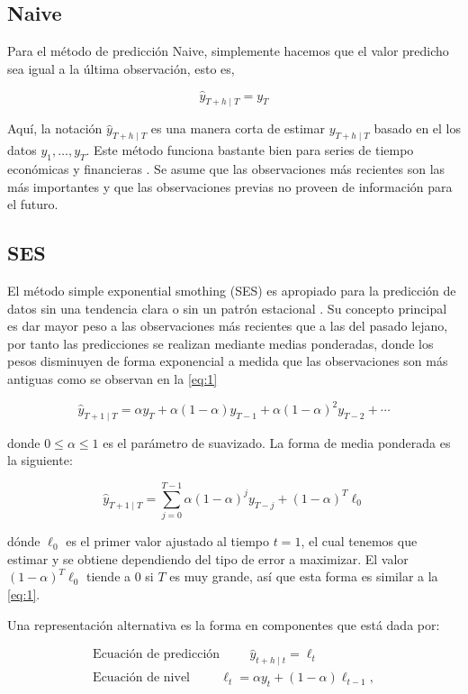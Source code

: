 \subsection{Naive}

Para el método de predicción Naive, simplemente hacemos que el valor predicho sea igual a la última observación, esto es,

\[ \hat{y}_{T+h \mid T}=y_{T} \]

Aquí, la notación $\hat{y}_{T+h \mid T}$ es una manera corta de estimar $y_{T+h \mid T}$ basado en el los datos $y_{1}, \ldots, y_{T}$. Este método funciona bastante bien para series de tiempo económicas y financieras \cite{hyndmanForecastingPrinciplesPractice}.
Se asume que las observaciones más recientes son las más importantes y que las observaciones previas no proveen de información para el futuro.

\subsection{SES}
El método simple exponential smothing (SES) es apropiado para la predicción de datos sin una tendencia clara o sin un patrón estacional \cite{hyndmanForecastingPrinciplesPractice}. Su concepto principal es dar mayor peso a las observaciones más recientes que a las del pasado lejano, por tanto las predicciones se realizan mediante medias ponderadas, donde los pesos disminuyen de forma exponencial a medida que las observaciones son más antiguas como se observan en la \autoref{eq:1}

\begin{equation}
	\hat{y}_{T+1 \mid T}=\alpha y_{T}+\alpha(1-\alpha) y_{T-1}+\alpha(1-\alpha)^{2} y_{T-2}+\cdots
	\label{eq:1}
\end{equation}

donde $0 \leq \alpha \leq 1$ es el parámetro de suavizado. La forma de media ponderada es la siguiente:

\[\hat{y}_{T+1 \mid T}=\sum_{j=0}^{T-1} \alpha(1-\alpha)^{j} y_{T-j}+(1-\alpha)^{T} \ell_{0}\]

dónde $\ell_{0}$ es el primer valor ajustado al tiempo $t=1$, el cual tenemos que estimar y se obtiene dependiendo del tipo de error a maximizar. El valor $(1-\alpha)^{T} \ell_{0}$ tiende a $0$ si $T$ es muy grande, así que esta forma es similar a la \autoref{eq:1}. 

Una representación alternativa es la forma en componentes que está dada por:

\begin{equation*}
	\begin{array}{lcl} 
		\textrm{Ecuación de predicción} \hspace{1cm} \hat{y}_{t+h \mid t}=\ell_{t}\\
		\textrm{Ecuación de nivel}\hspace{1cm} \ell_{t}=\alpha y_{t}+(1-\alpha) \ell_{t-1},
	\end{array} 
\end{equation*}


